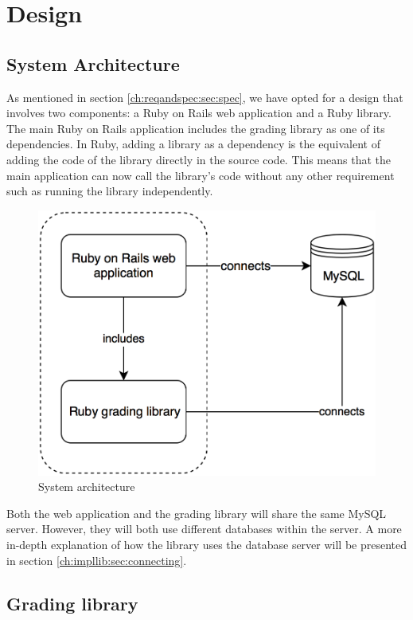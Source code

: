 \chapter{Design}

\section{System Architecture}

As mentioned in section \ref{ch:reqandspec:sec:spec}, we have opted for a design that involves two components: a Ruby on Rails web application and a Ruby library. The main Ruby on Rails application includes the grading library as one of its dependencies. In Ruby, adding a library as a dependency is the equivalent of adding the code of the library directly in the source code. This means that the main application can now call the library's code without any other requirement such as running the library independently.

\begin{figure}[H]
    \centering
    \includegraphics[width=(\linewidth / 2)]{Chapters/4-Design/sysarh.png}
    \caption{System architecture}
\end{figure}

Both the web application and the grading library will share the same MySQL server. However, they will both use different databases within the server. A more in-depth explanation of how the library uses the database server will be presented in section \ref{ch:impllib:sec:connecting}.

\section{Grading library}


